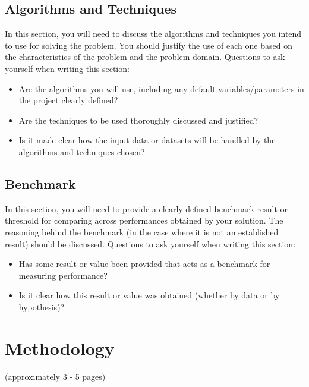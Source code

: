\documentclass[twoside,openright,titlepage,numbers=noenddot,headinclude,%
               footinclude=true,cleardoublepage=empty,abstractoff,BCOR=5mm,%
               paper=a4,fontsize=11pt,ngerman,american]{scrreprt}
\numberwithin{theorem}{chapter}
\numberwithin{definition}{chapter}
\numberwithin{algorithm}{chapter}
\numberwithin{figure}{chapter}
\numberwithin{table}{chapter}
\numberwithin{equation}{chapter}
\begin{document}
\section*{Algorithms and Techniques}

In this section, you will need to discuss the algorithms and techniques you intend to use for solving the problem. You should justify the use of each one based on the characteristics of the problem and the problem domain. Questions to ask yourself when writing this section:
\begin{itemize}%
\item Are the algorithms you will use, including any default variables/parameters in the project clearly defined?
\item Are the techniques to be used thoroughly discussed and justified?
\item Is it made clear how the input data or datasets will be handled by the algorithms and techniques chosen?
\end{itemize}

\section*{Benchmark}

In this section, you will need to provide a clearly defined benchmark result or threshold for comparing across performances obtained by your solution. The reasoning behind the benchmark (in the case where it is not an established result) should be discussed. Questions to ask yourself when writing this section:
\begin{itemize}%
\item Has some result or value been provided that acts as a benchmark for measuring performance?
\item Is it clear how this result or value was obtained (whether by data or by hypothesis)?
\end{itemize}

\chapter*{Methodology}

(approximately 3 - 5 pages)
\end{document}
